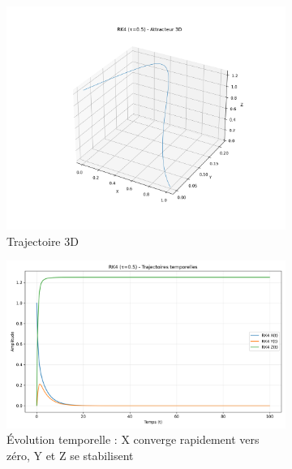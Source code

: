 \begin{figure}[H]
    \centering
    \begin{subfigure}[b]{0.5\textwidth}
        \includegraphics[width=\textwidth]{figures/rk4/rk4_tau0.5_3d}
        \caption{Trajectoire 3D}
    \end{subfigure}
    \begin{subfigure}[b]{0.4\textwidth}
        \includegraphics[width=\textwidth]{figures/rk4/rk4_tau0.5_time}
        \caption{Évolution temporelle : X converge rapidement vers zéro, Y et Z se stabilisent}
    \end{subfigure}
    \begin{subfigure}[b]{0.3\textwidth}

\end{subfigure}
\end{figure}

